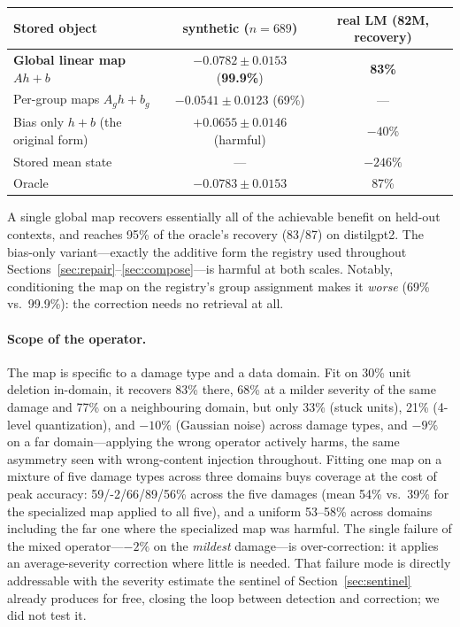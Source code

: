 \documentclass[11pt]{article}
\begin{document}
\begin{center}
\small
\begin{tabular}{@{}lcc@{}}
\toprule
Stored object & synthetic ($n{=}689$) & real LM (82M, recovery) \\
\midrule
\textbf{Global linear map} $A h + b$ & $\mathbf{-0.0782 \pm 0.0153}$ (\textbf{99.9\%}) & \textbf{83\%} \\
Per-group maps $A_g h + b_g$ & $-0.0541 \pm 0.0123$ (69\%) & --- \\
Bias only $h + b$ (the original form) & $+0.0655 \pm 0.0146$ (harmful) & $-40\%$ \\
Stored mean state & --- & $-246\%$ \\
Oracle & $-0.0783 \pm 0.0153$ & 87\% \\
\bottomrule
\end{tabular}
\end{center}

A single global map recovers essentially all of the achievable benefit on
held-out contexts, and reaches 95\% of the oracle's recovery (83/87) on
distilgpt2. The bias-only variant---exactly the additive form the registry used
throughout Sections~\ref{sec:repair}--\ref{sec:compose}---is harmful at both
scales. Notably, conditioning the map on the registry's group assignment makes
it \emph{worse} (69\% vs.\ 99.9\%): the correction needs no retrieval at all.

\paragraph{Scope of the operator.} The map is specific to a damage type and a
data domain. Fit on 30\% unit deletion in-domain, it recovers 83\% there, 68\%
at a milder severity of the same damage and 77\% on a neighbouring domain, but
only 33\% (stuck units), 21\% (4-level quantization), and $-10\%$ (Gaussian
noise) across damage types, and $-9\%$ on a far domain---applying the wrong
operator actively harms, the same asymmetry seen with wrong-content injection
throughout. Fitting one map on a mixture of five damage types across three
domains buys coverage at the cost of peak accuracy: 59/-2/66/89/56\% across the
five damages (mean 54\% vs.\ 39\% for the specialized map applied to all five),
and a uniform 53--58\% across domains including the far one where the
specialized map was harmful. The single failure of the mixed operator---$-2\%$
on the \emph{mildest} damage---is over-correction: it applies an
average-severity correction where little is needed. That failure mode is
directly addressable with the severity estimate the sentinel of
Section~\ref{sec:sentinel} already produces for free, closing the loop between
detection and correction; we did not test it.
\end{document}
